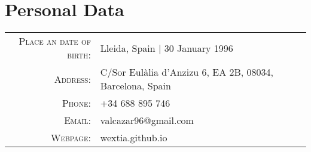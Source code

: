\section{Personal Data}
\begin{center}
\begin{tabular}{ r l }
	\textsc{Place an date of birth:} 	& Lleida, Spain | 30 January 1996 	\\
	\textsc{Address:}			& C/Sor Eulàlia d'Anzizu 6, EA 2B, 08034, Barcelona, Spain \\
	\textsc{Phone:}				& +34 688 895 746 			\\
	\textsc{Email:}				& valcazar96@gmail.com 			\\
	\textsc{Webpage:}			& wextia.github.io			\\
\end{tabular}
\end{center}
